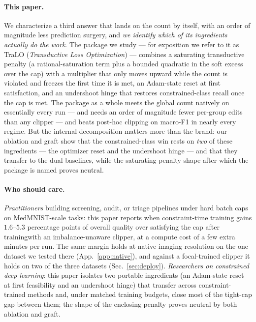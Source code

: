 \documentclass[10pt]{article}
\begin{document}
\paragraph{This paper.} We characterize a third answer that lands on the count
by itself, {with an order of
magnitude less prediction surgery}, and \emph{we identify which of its
ingredients actually do the work}. The package we study --- for exposition we
refer to it as TraLO (\emph{Transductive Loss Optimization}) --- combines a
saturating transductive penalty (a rational-saturation term plus a bounded
quadratic in the soft excess over the cap) with a multiplier that only moves
upward while the count is violated and freezes the first time it is met, an
Adam-state reset at first satisfaction, and an undershoot hinge that restores
constrained-class recall once the cap is met. The package as a whole meets the
{global} count natively on essentially every run
{--- and needs an order of magnitude fewer per-group edits than any
clipper ---} and beats post-hoc clipping on macro-F1
in nearly every regime. But the internal decomposition matters more than the
brand: our ablation and graft show that the constrained-class win rests on
\emph{two} of these ingredients --- the optimizer reset and the undershoot
hinge --- and that they transfer to the dual baselines, while the saturating
penalty shape after which the package is named proves neutral.

\paragraph{Who should care.}
\emph{Practitioners} building screening, audit, or triage pipelines under
hard batch caps on MedMNIST-scale tasks: this paper reports when
constraint-time training gains $1.6$--$5.3$ percentage points of overall
quality over satisfying the cap after training{with an
imbalance-unaware clipper}, at a compute cost of a few
extra minutes per run. 
{The same margin holds at native imaging resolution on the one
dataset we tested there (App.~\ref{app:native}), and against a focal-trained
clipper it holds on two of the three datasets (Sec.~\ref{sec:deploy}).}
\emph{Researchers on constrained deep learning}: this paper isolates two
portable ingredients (an Adam-state reset at first feasibility and an
undershoot hinge) that transfer across constraint-trained methods and,
under matched training budgets, close most of the tight-cap gap between
them; the shape of the enclosing penalty proves neutral by both ablation
and graft.
\end{document}
